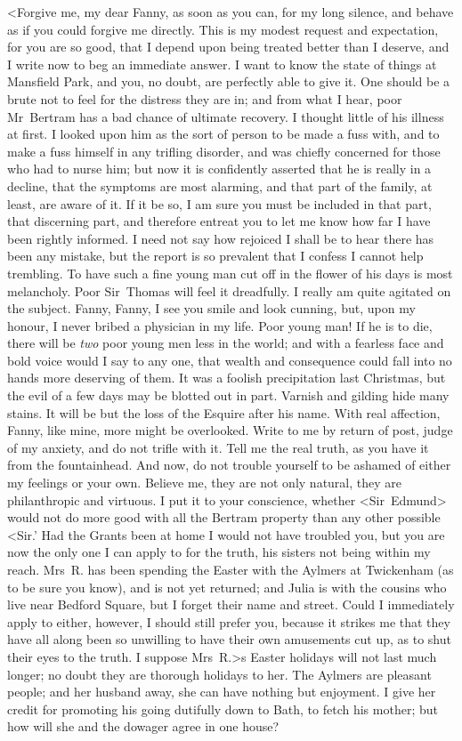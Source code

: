 <Forgive me, my dear Fanny, as soon as you can, for my long silence, and behave as if you could forgive me directly. This is my modest request and expectation, for you are so good, that I depend upon being treated better than I deserve, and I write now to beg an immediate answer. I want to know the state of things at Mansfield Park, and you, no doubt, are perfectly able to give it. One should be a brute not to feel for the distress they are in; and from what I hear, poor Mr~Bertram has a bad chance of ultimate recovery. I thought little of his illness at first. I looked upon him as the sort of person to be made a fuss with, and to make a fuss himself in any trifling disorder, and was chiefly concerned for those who had to nurse him; but now it is confidently asserted that he is really in a decline, that the symptoms are most alarming, and that part of the family, at least, are aware of it. If it be so, I am sure you must be included in that part, that discerning part, and therefore entreat you to let me know how far I have been rightly informed. I need not say how rejoiced I shall be to hear there has been any mistake, but the report is so prevalent that I confess I cannot help trembling. To have such a fine young man cut off in the flower of his days is most melancholy. Poor Sir~Thomas will feel it dreadfully. I really am quite agitated on the subject. Fanny, Fanny, I see you smile and look cunning, but, upon my honour, I never bribed a physician in my life. Poor young man! If he is to die, there will be \textit{two}  poor young men less in the world; and with a fearless face and bold voice would I say to any one, that wealth and consequence could fall into no hands more deserving of them. It was a foolish precipitation last Christmas, but the evil of a few days may be blotted out in part. Varnish and gilding hide many stains. It will be but the loss of the Esquire after his name. With real affection, Fanny, like mine, more might be overlooked. Write to me by return of post, judge of my anxiety, and do not trifle with it. Tell me the real truth, as you have it from the fountainhead. And now, do not trouble yourself to be ashamed of either my feelings or your own. Believe me, they are not only natural, they are philanthropic and virtuous. I put it to your conscience, whether <Sir~Edmund> would not do more good with all the Bertram property than any other possible <Sir.' Had the Grants been at home I would not have troubled you, but you are now the only one I can apply to for the truth, his sisters not being within my reach. Mrs~R. has been spending the Easter with the Aylmers at Twickenham (as to be sure you know), and is not yet returned; and Julia is with the cousins who live near Bedford Square, but I forget their name and street. Could I immediately apply to either, however, I should still prefer you, because it strikes me that they have all along been so unwilling to have their own amusements cut up, as to shut their eyes to the truth. I suppose Mrs~R.>s Easter holidays will not last much longer; no doubt they are thorough holidays to her. The Aylmers are pleasant people; and her husband away, she can have nothing but enjoyment. I give her credit for promoting his going dutifully down to Bath, to fetch his mother; but how will she and the dowager agree in one house? 